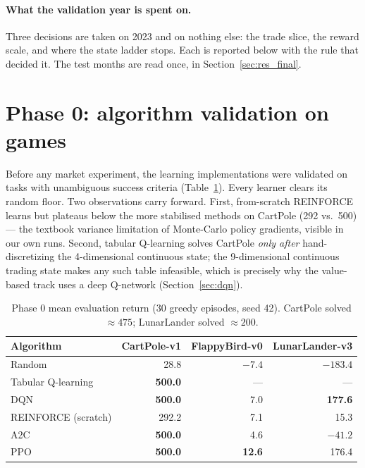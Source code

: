 \paragraph{What the validation year is spent on.} Three decisions are taken
on 2023 and on nothing else: the trade slice, the reward scale, and where
the state ladder stops. Each is reported below with the rule that decided
it. The test months are read once, in Section~\ref{sec:res_final}.

\section{Phase 0: algorithm validation on games}
\label{sec:res_phase0}

Before any market experiment, the learning implementations were validated
on tasks with unambiguous success criteria
(Table~\ref{tab:res_phase0}). Every learner clears its random floor. Two
observations carry forward. First, from-scratch REINFORCE learns but
plateaus below the more stabilised methods on CartPole (292 vs.\ 500) ---
the textbook variance limitation of Monte-Carlo policy gradients,
visible in our own runs. Second, tabular Q-learning solves CartPole
\emph{only after} hand-discretizing the 4-dimensional continuous state;
the 9-dimensional continuous trading state makes any such table
infeasible, which is precisely why the value-based track uses a deep
Q-network (Section~\ref{sec:dqn}).

\begin{table}[h]
\centering
\caption{Phase 0 mean evaluation return (30 greedy episodes, seed 42).
CartPole solved $\approx 475$; LunarLander solved $\approx 200$.}
\label{tab:res_phase0}
\begin{tabular}{lrrr}
\toprule
\textbf{Algorithm} & \textbf{CartPole-v1} & \textbf{FlappyBird-v0} & \textbf{LunarLander-v3} \\
\midrule
Random                  & 28.8           & $-7.4$        & $-183.4$ \\
Tabular Q-learning      & \textbf{500.0} & ---           & --- \\
DQN                     & \textbf{500.0} & 7.0           & \textbf{177.6} \\
REINFORCE (scratch)     & 292.2          & 7.1           & 15.3 \\
A2C                     & \textbf{500.0} & 4.6           & $-41.2$ \\
PPO                     & \textbf{500.0} & \textbf{12.6} & 176.4 \\
\bottomrule
\end{tabular}
\end{table}

